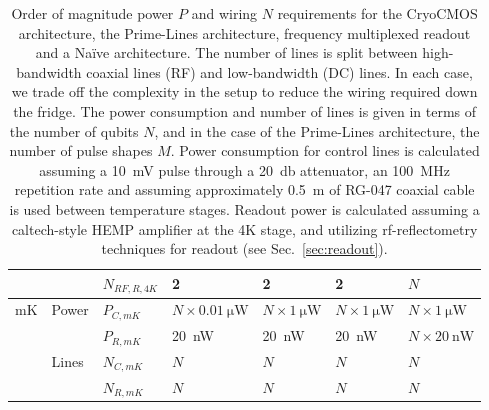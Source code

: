 {\begin{landscape}
\begin{table}
\begin{tabular}{|l|l|l|l|l|l|l|}
                        &                        & $N_{RF,R,4K}$ & 2                         & 2                        & 2   & $N$                 \\\hline
    \multirow{4}{*}{mK} & \multirow{2}{*}{Power} & $P_{C,mK}$ & $N\times\SI{0.01}{\micro\watt}$ & $ N\times\SI{1}{\micro\watt}$ & $N\times\SI{1}{\micro\watt}$   & $N\times\SI{1}{\micro\watt}$                   \\\cline{3-7}
                        &                        & $P_{R,mK}$ & \SI{20}{\nano\watt}     & \SI{20}{\nano\watt}           &\SI{20}{\nano\watt}   & $N\times\SI{20}{\nano\watt}$ \\\cline{2-7}
                        & \multirow{2}{*}{Lines} & $N_{C,mK}$ & $N$                     & $N$                           & $N$ & $N$                 \\\cline{3-7}
                        &                        & $N_{R,mK}$ & $N$                     & $N$                           & $N$ & $N$                 \\\hline
    \end{tabular}
    \caption[Approximate power and wiring requirements for a QC]{Order of magnitude power $P$ and wiring $N$ requirements for the CryoCMOS architecture, the Prime-Lines architecture, frequency multiplexed readout and a Na\"ive architecture. The number of lines is split between high-bandwidth coaxial lines (RF) and low-bandwidth (DC) lines. In each case, we trade off the complexity in the setup to reduce the wiring required down the fridge. The power consumption and number of lines is given in terms of the number of qubits $N$, and in the case of the Prime-Lines architecture, the number of pulse shapes $M$. Power consumption for control lines is calculated assuming a \SI{10}{\milli\volt} pulse through a \SI{20}{\decibel} attenuator, an \SI{100}{\mega\hertz} repetition rate and assuming approximately \SI{0.5}{\meter} of RG-047 coaxial cable is used between temperature stages. Readout power is calculated assuming a caltech-style HEMP amplifier at the 4K stage, and utilizing rf-reflectometry techniques for readout (see Sec.~\ref{sec:readout}).}
    \label{tab:arch}
  \end{table}
\end{landscape}
}


